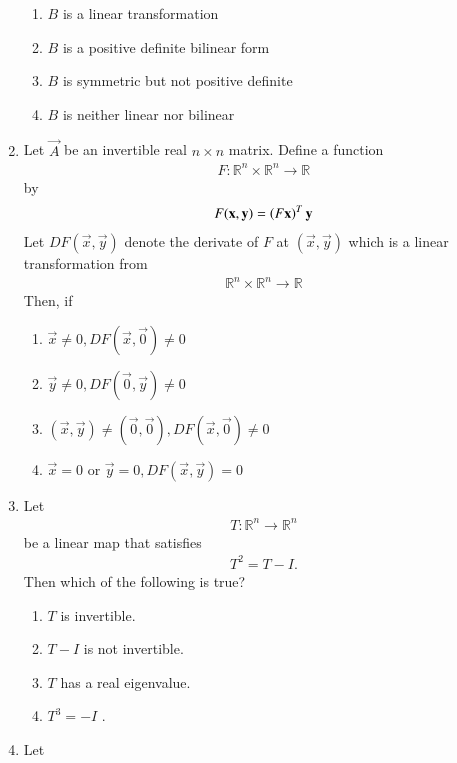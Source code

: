 \begin{enumerate}[label=\thesection.\arabic*.,ref=\thesection.\theenumi]
\begin{enumerate}
\item $B$ is a linear transformation
\item $B$ is a positive definite bilinear form
\item $B$ is symmetric but not positive definite
\item $B$ is neither linear nor bilinear
\end{enumerate}  
%
\item Let $\vec{A}$ be an invertible real $n \times n$ matrix.  Define a function
\begin{align}
F: \mathbb{R}^n \times \mathbb{R}^n \to \mathbb{R}
\end{align}
by 
\begin{align}
F(\mathbf{x},\mathbf{y}) = \left(F\mathbf{x}\right)^T\mathbf{y}
\end{align}
Let $DF(\vec{x},\vec{y}) $ denote the derivate of $F$ at $(\vec{x},\vec{y}) $ which is 
a linear transformation from 
\begin{align}
\mathbb{R}^n \times \mathbb{R}^n \to \mathbb{R}
\end{align}
%
Then, if 
\begin{enumerate}
\item $\vec{x} \ne 0, DF(\vec{x},\vec{0}) \ne 0$ 
\item $\vec{y} \ne 0, DF(\vec{0},\vec{y}) \ne 0$ 
\item $(\vec{x},\vec{y}) \ne (\vec{0},\vec{0}), DF(\vec{x},\vec{0}) \ne 0$ 
\item $\vec{x} = 0$ or  $\vec{y} = 0, DF(\vec{x},\vec{y}) = 0$ 
\end{enumerate}  
%
\solution

%
\item Let
\begin{align}
T: \mathbb{R}^n \to \mathbb{R}^n
\end{align}
%
be a linear map that satisfies 
\begin{align}
T^2 = T-I.
\end{align}
Then which of the following is true?
\begin{enumerate}
\item $T$ is invertible. 
\item $T-I$ is not invertible. 
\item $T$ has a real eigenvalue. 
\item $T^3 = -I$ . 
\end{enumerate}
%
\solution

\item Let
\begin{align}

\end{align}
\end{enumerate}
